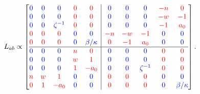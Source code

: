 \documentclass[a4paper, amsfonts, amssymb, amsmath, reprint, showkeys, nofootinbib, twoside, onecolumn,notitlepage]{revtex4-1}
\begin{document}
\begin{equation}\label{sangria}
L_{ab} \propto 
\left[\begin{array}{@{}ccccc|ccccc@{}}
\textcolor{blue}{0}& \textcolor{blue}{0}& \textcolor{blue}{0}& \textcolor{red}{0}& \textcolor{red}{0}& \textcolor{blue}{0} & \textcolor{blue}{0} & \textcolor{blue}{0} & \textcolor{red}{-n} & \textcolor{red}{0} \\
\textcolor{blue}{0}& \textcolor{blue}{0}& \textcolor{blue}{0}& \textcolor{red}{0}& \textcolor{red}{0}& \textcolor{blue}{0} & \textcolor{blue}{0} & \textcolor{blue}{0} & \textcolor{red}{-w} & \textcolor{red}{-1} \\
\textcolor{blue}{0}& \textcolor{blue}{0}& \textcolor{blue}{\zeta^{-1}}& \textcolor{red}{0}& \textcolor{red}{0}& \textcolor{blue}{0} & \textcolor{blue}{0} & \textcolor{blue}{0} & \textcolor{red}{-1} & \textcolor{red}{a_0} \\
\textcolor{red}{0}& \textcolor{red}{0}& \textcolor{red}{0}& \textcolor{blue}{0}& \textcolor{blue}{0}& \textcolor{red}{-n} & \textcolor{red}{-w} & \textcolor{red}{-1} & \textcolor{blue}{0} & \textcolor{blue}{0} \\
\textcolor{red}{0}& \textcolor{red}{0}& \textcolor{red}{0}& \textcolor{blue}{0}& \textcolor{blue}{\beta/\kappa}& \textcolor{red}{0} & \textcolor{red}{-1} & \textcolor{red}{a_0} & \textcolor{blue}{0} & \textcolor{blue}{0} \\ \hline
\textcolor{blue}{0}& \textcolor{blue}{0}& \textcolor{blue}{0}& \textcolor{red}{n}& \textcolor{red}{0}& \textcolor{blue}{0} & \textcolor{blue}{0} & \textcolor{blue}{0} & \textcolor{red}{0} & \textcolor{red}{0} \\
\textcolor{blue}{0}& \textcolor{blue}{0}& \textcolor{blue}{0}& \textcolor{red}{w}& \textcolor{red}{1}& \textcolor{blue}{0} & \textcolor{blue}{0} & \textcolor{blue}{0} & \textcolor{red}{0} & \textcolor{red}{0} \\
\textcolor{blue}{0}& \textcolor{blue}{0}& \textcolor{blue}{0}& \textcolor{red}{1}& \textcolor{red}{-a_0}& \textcolor{blue}{0} & \textcolor{blue}{0} & \textcolor{blue}{\zeta^{-1}} & \textcolor{red}{0} & \textcolor{red}{0} \\
\textcolor{red}{n}& \textcolor{red}{w}& \textcolor{red}{1}& \textcolor{blue}{0}& \textcolor{blue}{0}& \textcolor{red}{0} & \textcolor{red}{0} & \textcolor{red}{0} & \textcolor{blue}{0} & \textcolor{blue}{0} \\
\textcolor{red}{0}& \textcolor{red}{1}& \textcolor{red}{-a_0}& \textcolor{blue}{0}& \textcolor{blue}{0}& \textcolor{red}{0} & \textcolor{red}{0} & \textcolor{red}{0} & \textcolor{blue}{0} & \textcolor{blue}{\beta/\kappa} \\
\end{array}\right] .
\end{equation}
\end{document}
